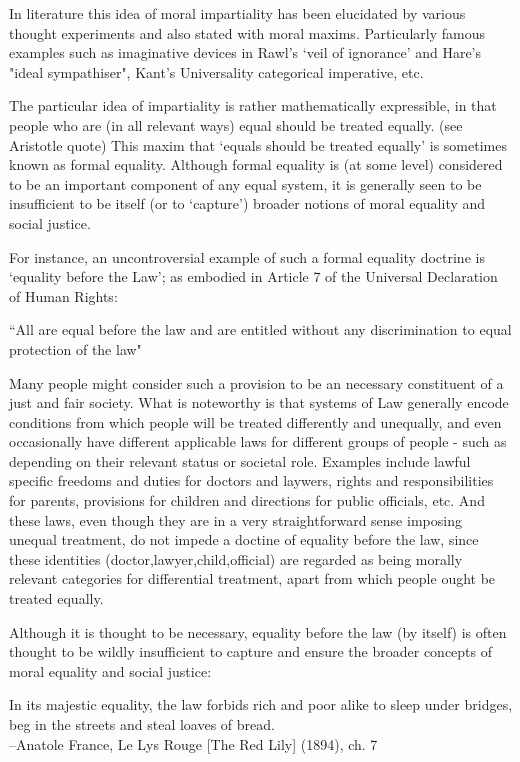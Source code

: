 In literature this idea of moral impartiality has been elucidated by various thought experiments and also stated with moral maxims.
Particularly famous examples such as imaginative devices in Rawl's `veil of ignorance' and Hare's "ideal sympathiser", Kant's Universality categorical imperative, etc.

The particular idea of impartiality is rather mathematically expressible, in that people who are (in all relevant ways) equal should be treated equally. (see Aristotle quote) This maxim that `equals should be treated equally' is sometimes known as formal equality.\cite{whatisbasicequalitynathan}
Although formal equality is (at some level) considered to be an important component of any equal system, it is generally seen to be insufficient to be itself (or to `capture') broader notions of moral equality and social justice.

For instance, an uncontroversial example of such a formal equality doctrine is `equality before the Law'; as embodied in Article 7 of the Universal Declaration of Human Rights: 
\begin{displayquote}
``All are equal before the law and are entitled without any discrimination to equal protection of the law"\cite{udhr}
\end{displayquote}
Many people might consider such a provision to be an necessary constituent of a just and fair society.
What is noteworthy is that systems of Law generally encode conditions from which people will be treated differently and unequally, and even occasionally have different applicable laws for different groups of people - such as depending on their relevant status or societal role.
Examples include lawful specific freedoms and duties for doctors and laywers, rights and responsibilities for parents, provisions for children and directions for public officials, etc.
And these laws, even though they are in a very straightforward sense imposing unequal treatment, do not impede a doctine of equality before the law, since these identities (doctor,lawyer,child,official) are regarded as being morally relevant categories for differential treatment, apart from which people ought be treated equally.

Although it is thought to be necessary, equality before the law (by itself) is often thought to be wildly insufficient to capture and ensure the broader concepts of moral equality and social justice:
\begin{displayquote}
In its majestic equality, the law forbids rich and poor alike to sleep under bridges, beg in the streets and steal loaves of bread.\\
--Anatole France, Le Lys Rouge [The Red Lily] (1894), ch. 7
\end{displayquote}

